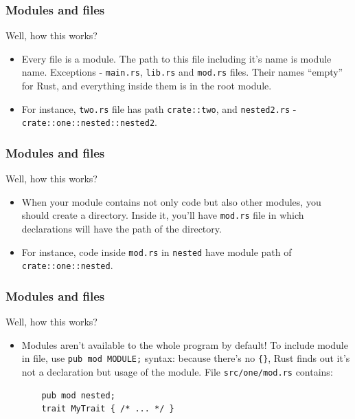 \documentclass[aspectratio=1610,t]{beamer}
\begin{document}
\begin{frame}[fragile]
\frametitle{Modules and files}
Well, how this works?

\begin{itemize}
    \item<1-> Every file is a module. The path to this file including it's name is module name. Exceptions - \texttt{main.rs}, \texttt{lib.rs} and \texttt{mod.rs} files. Their names ``empty'' for Rust, and everything inside them is in the root module.
    \item<2-> For instance, \texttt{two.rs} file has path \texttt{crate::two}, and \texttt{nested2.rs} - \texttt{crate::one::nested::nested2}.
\end{itemize}
\end{frame}


\begin{frame}[fragile]
\frametitle{Modules and files}
Well, how this works?

\begin{itemize}
    \item<1-> When your module contains not only code but also other modules, you should create a directory. Inside it, you'll have \texttt{mod.rs} file in which declarations will have the path of the directory.
    \item<2-> For instance, code inside \texttt{mod.rs} in \texttt{nested} have module path of \texttt{crate::one::nested}.
\end{itemize}
\end{frame}


\begin{frame}[fragile]
\frametitle{Modules and files}
Well, how this works?

\begin{itemize}
    \item<1-> Modules aren't available to the whole program by default! To include module in file, use \texttt{pub mod MODULE;} syntax: because there's no \texttt{\{\}}, Rust finds out it's not a declaration but usage of the module. File \texttt{src/one/mod.rs} contains:

    \begin{verbatim}
    pub mod nested;
    trait MyTrait { /* ... */ }
    \end{verbatim}
\end{itemize}
\end{frame}
\end{document}
